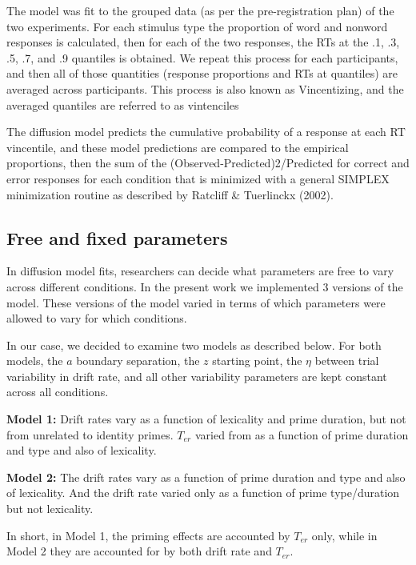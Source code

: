 \documentclass[
  english,
  man,floatsintext]{apa6}
\begin{document}
\begin{appendix}
The model was fit to the grouped data (as per the pre-registration plan)
of the two experiments. For each stimulus type the proportion of word
and nonword responses is calculated, then for each of the two responses,
the RTs at the .1, .3, .5, .7, and .9 quantiles is obtained. We repeat
this process for each participants, and then all of those quantities
(response proportions and RTs at quantiles) are averaged across
participants. This process is also known as Vincentizing, and the
averaged quantiles are referred to as vintenciles

The diffusion model predicts the cumulative probability of a response at
each RT vincentile, and these model predictions are compared to the
empirical proportions, then the sum of the
(Observed-Predicted)2/Predicted for correct and error responses for each
condition that is minimized with a general SIMPLEX minimization routine
as described by Ratcliff \& Tuerlinckx (2002).

\hypertarget{free-and-fixed-parameters}{%
\subsection{Free and fixed parameters}\label{free-and-fixed-parameters}}

In diffusion model fits, researchers can decide what parameters are free
to vary across different conditions. In the present work we implemented
3 versions of the model. These versions of the model varied in terms of
which parameters were allowed to vary for which conditions.

In our case, we decided to examine two models as described below. For
both models, the \(a\) boundary separation, the \(z\) starting point,
the \(\eta\) between trial variability in drift rate, and all other
variability parameters are kept constant across all conditions.

\textbf{Model 1:} Drift rates vary as a function of lexicality and prime
duration, but not from unrelated to identity primes. \(T_{er}\) varied
from as a function of prime duration and type and also of lexicality.

\textbf{Model 2:} The drift rates vary as a function of prime duration
and type and also of lexicality. And the drift rate varied only as a
function of prime type/duration but not lexicality.

In short, in Model 1, the priming effects are accounted by \(T_{er}\)
only, while in Model 2 they are accounted for by both drift rate and
\(T_{er}\).


\end{appendix}
\end{document}
